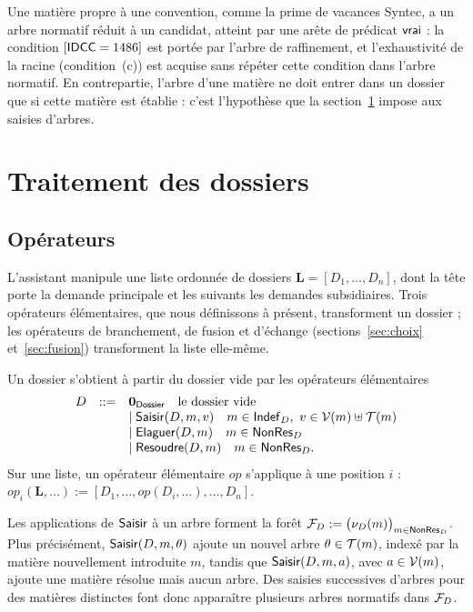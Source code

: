 \documentclass[review]{jflart}
\newcommand{\Liste}{\ensuremath{\mathbf L}}
\begin{document}
Une matière propre à une convention, comme la prime de vacances Syntec, a un
arbre normatif réduit à un candidat, atteint par une arête de prédicat
\(\mathsf{vrai}\) : la condition \([\mathsf{IDCC}=1486]\) est portée par l'arbre de
raffinement, et l'exhaustivité de la racine (condition~(c)) est acquise sans
répéter cette condition dans l'arbre normatif. En contrepartie, l'arbre
d'une matière ne doit entrer dans un dossier que si cette matière est établie :
c'est l'hypothèse que la section~\ref{sec:op} impose aux saisies d'arbres.

\section{Traitement des dossiers}\label{sec:op}

\subsection{Opérateurs}
L'assistant manipule une liste ordonnée de dossiers
\(\Liste=[D_1,\ldots,D_n]\), dont la tête porte la demande principale et les
suivants les demandes subsidiaires. Trois opérateurs élémentaires, que nous
définissons à présent, transforment un dossier ; les opérateurs de branchement,
de fusion et d'échange (sections~\ref{sec:choix} et~\ref{sec:fusion})
transforment la liste elle-même.
\begin{defi}\label{def:operateurs}
Un dossier s'obtient à partir du dossier vide par les opérateurs élémentaires
\[
\begin{array}{lll}
D &::=& \mathbf{0}_{\mathsf{Dossier}} \quad \text{le dossier vide}\\
&& \mid \mathsf{Saisir}(D,m,v)\quad m\in\mathsf{Indef}_D,\ v\in\mathcal{V}(m)\uplus\mathcal{T}(m)\\
&& \mid \mathsf{Elaguer}(D,m)\quad m\in\mathsf{NonRes}_D \\
&& \mid \mathsf{Resoudre}(D,m)\quad m\in\mathsf{NonRes}_D.
\end{array}
\]
Sur une liste, un opérateur élémentaire \(\mathit{op}\) s'applique à une
position \(i\) :
\(\mathit{op}_i(\Liste,\ldots):=[D_1,\ldots,\mathit{op}(D_i,\ldots),\ldots,D_n]\).
\end{defi}
Les applications de \(\mathsf{Saisir}\) à un arbre forment la forêt
\(\mathcal{F}_D:=\bigl(\nu_D(m)\bigr)_{m\in\mathsf{NonRes}_D}\). Plus précisément,
\(\mathsf{Saisir}(D,m,\theta)\) ajoute un nouvel arbre \(\theta\in\mathcal{T}(m)\), indexé par
la matière nouvellement introduite \(m\), tandis que \(\mathsf{Saisir}(D,m,a)\), avec
\(a\in\mathcal{V}(m)\), ajoute une matière résolue mais aucun arbre. Des saisies
successives d'arbres pour des matières distinctes font donc apparaître
plusieurs arbres normatifs dans \(\mathcal{F}_D\).
\end{document}
